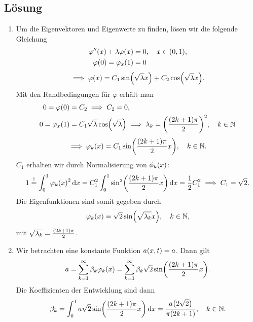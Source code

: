 \documentclass{exercise}
\begin{document}
    \subsection*{Lösung}
    \begin{enumerate}
        \item Um die Eigenvektoren und Eigenwerte zu finden, lösen wir die folgende Gleichung
        \begin{align*}
            \varphi''\parentheses*{x} + \lambda\varphi\parentheses*{x} &= 0, \quad x \in \parentheses*{0, 1},\\
            \varphi\parentheses*{0} = \varphi_x\parentheses*{1} &= 0
        \end{align*}
        \[
            \implies \varphi\parentheses*{x} = C_1\sin\parentheses*{\sqrt{\lambda}x} + C_2\cos\parentheses*{\sqrt{\lambda}x}.
        \]
        Mit den Randbedingungen für \(\varphi\) erhält man
        \begin{align*}
            0 = \varphi\parentheses*{0} &= C_2 \implies C_2 = 0,\\
            0 = \varphi_x\parentheses*{1} &= C_1\sqrt{\lambda}\cos\parentheses*{\sqrt{\lambda}} \implies \lambda_k = \parentheses*{\frac{\parentheses*{2k + 1}\pi}{2}}^2, \quad k \in \N
        \end{align*}
        \[
            \implies \varphi_k\parentheses*{x} = C_1\sin\parentheses*{\frac{\parentheses*{2k + 1}\pi}{2}x}, \quad k \in \N.
        \]
        \(C_1\) erhalten wir durch Normalisierung von \(\phi_k\parentheses*{x}\):
        \[
            1 \stackrel{!}{=} \int_0^1 \varphi_k\parentheses*{x}^2 \d x = C_1^2 \int_0^1\sin^2\parentheses*{\frac{\parentheses*{2k + 1}\pi}{2}x}\d x = \frac{1}{2}C_1^2 \implies C_1 = \sqrt{2}.
        \]
        Die Eigenfunktionen sind somit gegeben durch
        \[
            \varphi_k\parentheses*{x} = \sqrt{2}\sin\parentheses*{\sqrt{\lambda_k}x}, \quad k \in \N,
        \]
        mit \(\sqrt{\lambda_k} = \frac{\parentheses*{2k + 1}\pi}{2}\).
        \item Wir betrachten eine konstante Funktion \(a\parentheses*{x, t} = a\).
        Dann gilt
        \[
            a = \sum_{k = 1}^\infty \beta_k \varphi_k\parentheses*{x} = \sum_{k = 1}^\infty \beta_k \sqrt{2}\sin\parentheses*{\frac{\parentheses*{2k + 1}\pi}{2}x}.
        \]
        Die Koeffizienten der Entwicklung sind dann
        \[
            \beta_k = \int_0^1 a\sqrt{2}\sin\parentheses*{\frac{\parentheses*{2k + 1}\pi}{2}x}\d x = \frac{a\parentheses*{2\sqrt{2}}}{\pi\parentheses*{2k + 1}}, \quad k \in \N.
\]
\end{enumerate}
\end{document}
